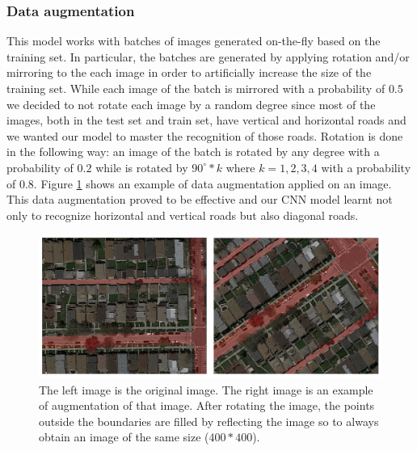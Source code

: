 \documentclass[10pt,conference,compsocconf]{IEEEtran}
\begin{document}
\subsubsection*{Data augmentation}
 This model works with batches of images generated on-the-fly based on the training set. In particular, the batches are generated by applying rotation and/or mirroring to the each image in order to artificially increase the size of the training set. While each image of the batch is mirrored with a probability of $0.5$ we decided to not rotate each image by a random degree since most of the images, both in the test set and train set, have vertical and horizontal roads and we wanted our model to master the recognition of those roads. Rotation is done in the following way: an image of the batch is rotated by any degree with a probability of $0.2$ while is rotated by $90^\circ*k$ where $k=1,2,3,4$ with a probability of $0.8$. Figure \ref{fig:data-augmentation} shows an example of data augmentation applied on an image. This data augmentation proved to be effective and our CNN model learnt not only to recognize horizontal and vertical roads but also diagonal roads.
\begin{figure}[tbp]
	\centering
	\includegraphics[width=0.8\columnwidth]{img/data_augmentation2.png}
	\caption{The left image is the original image. The right image is an example of augmentation of that image. After rotating the image, the points outside the boundaries are filled by reflecting the image so to always obtain an image of the same size ($400*400$).}
	\vspace{-3mm}
	\label{fig:data-augmentation}
\end{figure}
\end{document}
